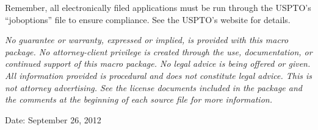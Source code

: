 Remember, all electronically filed applications must be run through
the USPTO's ``joboptions'' file to ensure compliance.  See the USPTO's
website for details.


{\it No guarantee or warranty, expressed or implied, is provided with
this macro package.  No attorney-client privilege is created through
the use, documentation, or continued support of this macro package.  No legal advice is
being offered or given.  All information provided is procedural and
does not constitute legal advice.  This is not attorney advertising.
See the license documents included in the package and the comments at
the beginning of each source file for more information.}

\indent Date: September 26, 2012\nl


\bye

